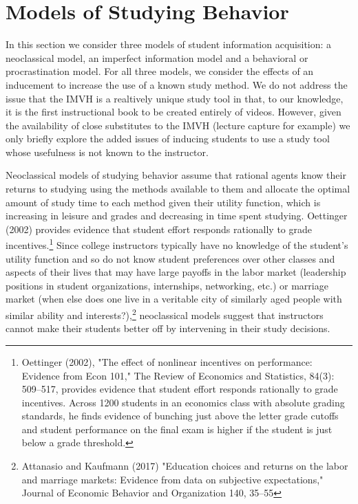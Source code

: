 \documentclass[12pt]{article}
\begin{document}

\section{Models of Studying Behavior}

In this section we consider three models of student information acquisition:  a neoclassical model, an imperfect information model and a behavioral or procrastination model.  For all three models, we consider the effects of an inducement to increase the use of a known study method.  We do not address the issue that the IMVH is a realtively unique study tool in that, to our knowledge, it is the first instructional book to be created entirely of videos.  However, given the availability of close substitutes to the IMVH (lecture capture for example) we only briefly explore the added issues of inducing students to use a study tool whose usefulness is not known to the instructor.

Neoclassical models of studying behavior assume that rational agents know their returns to studying using the methods available to them and allocate the optimal amount of study time to each method given their utility function, which is increasing in leisure and grades and decreasing in time spent studying.  Oettinger (2002) provides evidence that student effort responds rationally to grade incentives.\footnote{Oettinger (2002), "The effect of nonlinear incentives on performance: Evidence from Econ 101," The Review of Economics and Statistics, 84(3): 509–517, provides evidence that student effort responds rationally to grade incentives.  Across 1200 students in an economics class with absolute grading standards, he finds evidence of bunching just above the letter grade cutoffs and student performance on the final exam is higher if the student is just below a grade threshold.} Since college instructors typically have no knowledge of the student's utility function and so do not know student preferences over other classes and aspects of their lives that may have large payoffs in the labor market (leadership positions in student organizations, internships, networking, etc.) or marriage market (when else does one live in a veritable city of similarly aged people with similar ability and interests?),\footnote{Attanasio and Kaufmann (2017) "Education choices and returns on the labor and marriage markets: Evidence from data on subjective expectations," Journal of Economic Behavior and Organization 140, 35–55} neoclassical models suggest that instructors cannot make their students better off by intervening in their study decisions.
\end{document}
